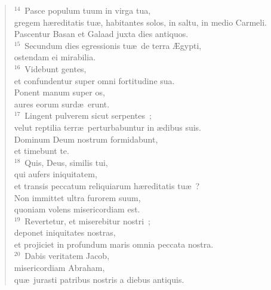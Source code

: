 \begin{verse}${}^{14}$~Pasce populum tuum in virga tua,\\ gregem h\ae reditatis tu\ae , habitantes solos, in saltu, in medio Carmeli.\\ Pascentur Basan et Galaad juxta dies antiquos.\\
${}^{15}$~Secundum dies egressionis tu\ae\ de terra \AE gypti,\\ ostendam ei mirabilia.\\
${}^{16}$~Videbunt gentes,\\ et confundentur super omni fortitudine sua.\\ Ponent manum super os,\\ aures eorum surd\ae\ erunt.\\
${}^{17}$~Lingent pulverem sicut serpentes~;\\ velut reptilia terr\ae\ perturbabuntur in \ae dibus suis.\\ Dominum Deum nostrum formidabunt,\\ et timebunt te.\\
${}^{18}$~Quis, Deus, similis tui,\\ qui aufers iniquitatem,\\ et transis peccatum reliquiarum h\ae reditatis tu\ae~?\\ Non immittet ultra furorem suum,\\ quoniam volens misericordiam est.\\
${}^{19}$~Revertetur, et miserebitur nostri~;\\ deponet iniquitates nostras,\\ et projiciet in profundum maris omnia peccata nostra.\\
${}^{20}$~Dabis veritatem Jacob,\\ misericordiam Abraham,\\ qu\ae\ jurasti patribus nostris a diebus antiquis.\end{verse}


